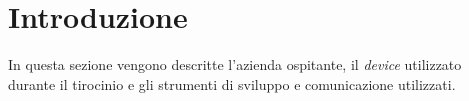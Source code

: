 \chapter{Introduzione}
\label{cap:introduzione}





In questa sezione vengono descritte l'azienda ospitante, il \emph{device} utilizzato durante il tirocinio e gli strumenti di sviluppo e comunicazione utilizzati.

